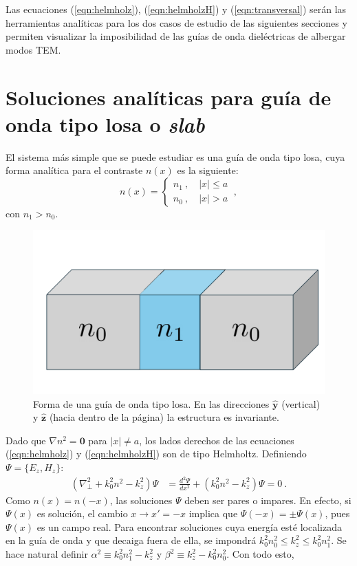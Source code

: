Las ecuaciones (\ref{eqn:helmholz}), (\ref{eqn:helmholzH}) y (\ref{eqn:transversal}) serán las herramientas analíticas para los dos casos de estudio de las siguientes secciones y permiten visualizar la imposibilidad de las guías de onda dieléctricas de albergar modos TEM.
\section{Soluciones analíticas para guía de onda tipo losa o \textit{slab} \label{cap:slab}}
El sistema más simple que se puede estudiar es una guía de onda tipo losa, cuya forma analítica para el contraste $n(x)$ es la siguiente:
\begin{equation*}
	n(x) = \left\{\begin{matrix}
	n_1 \ , \quad |x| \le a
	\\
	n_0 \ , \quad |x| > a
 	\end{matrix}\right. \ ,
\end{equation*}
con $n_1 > n_0$. \begin{figure}[H]
	\centering
	\includegraphics[width=0.6\linewidth]{media/slab.pdf}
	\caption[Forma de una guía de onda tipo losa.]{Forma de una guía de onda tipo losa. En las direcciones $\mathbf{\hat{y}}$ (vertical) y $\mathbf{\hat{z}}$ (hacia dentro de la página) la estructura es invariante.}
\end{figure}
Dado que $\nabla n^2 = \textbf{0}$ para $|x| \neq a$, los lados derechos de las ecuaciones (\ref{eqn:helmholz}) y (\ref{eqn:helmholzH}) son de tipo Helmholtz. Definiendo $\Psi = \{E_z, H_z\} $:
\begin{align*}
	(\nabla_\perp^2  + k_0^2n^2 - k_z^2) \Psi  &=  \frac{d^2\Psi}{dx^2} + (k_0^2n^2 - k_z^2) \Psi  = 0 \ .
\end{align*}
Como $n(x)=n(-x)$, las soluciones $\Psi$ deben ser pares o impares. En efecto, si $\Psi(x)$ es solución, el cambio $x\to x'=-x$ implica que $\Psi(-x)=\pm \Psi(x)$, pues $\Psi(x)$ es un campo real.
Para encontrar soluciones cuya energía esté localizada en la guía de onda y que decaiga fuera de ella, se impondrá $k_0^2n_0^2 \le k_z^2 \le k_0^2n_1^2$. Se hace natural definir $\alpha^2\equiv k_0^2n_1^2-k_z^2$ y $\beta^2\equiv k_z^2 - k_0^2n_0^2$. Con todo esto, 
